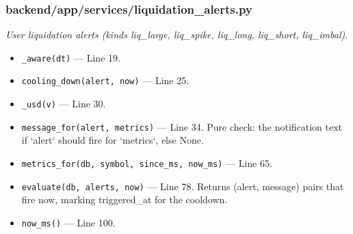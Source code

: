 \subsubsection*{backend/app/services/liquidation\_alerts.py}
\textit{User liquidation alerts (kinds liq\_large, liq\_spike, liq\_long, liq\_short, liq\_imbal).}
\begin{itemize}[nosep,leftmargin=1.5em]
\item \texttt{\_\allowbreak{}aware(\allowbreak{}dt)} --- Line 19.
\item \texttt{cooling\_\allowbreak{}down(\allowbreak{}alert,\allowbreak{} now)} --- Line 25.
\item \texttt{\_\allowbreak{}usd(\allowbreak{}v)} --- Line 30.
\item \texttt{message\_\allowbreak{}for(\allowbreak{}alert,\allowbreak{} metrics)} --- Line 34. Pure check: the notification text if `alert` should fire for `metrics`, else None.
\item \texttt{metrics\_\allowbreak{}for(\allowbreak{}db,\allowbreak{} symbol,\allowbreak{} since\_\allowbreak{}ms,\allowbreak{} now\_\allowbreak{}ms)} --- Line 65.
\item \texttt{evaluate(\allowbreak{}db,\allowbreak{} alerts,\allowbreak{} now)} --- Line 78. Returns (alert, message) pairs that fire now, marking triggered\_at for the cooldown.
\item \texttt{now\_\allowbreak{}ms(\allowbreak{})} --- Line 100.
\end{itemize}
